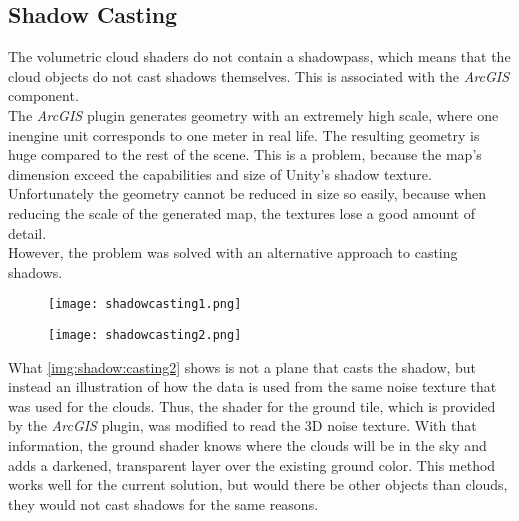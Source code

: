 \clearpage

\subsection{Shadow Casting}
\label{section:techimpl:shadow}
The \gls{volumetric} cloud \gls{shader}s do not contain a \gls{shadowpass}, which means that the cloud objects do not cast shadows themselves.
This is associated with the \emph{ArcGIS}  component.
\\
The \emph{ArcGIS} plugin generates geometry with an extremely high scale, where one \gls{inengine} unit corresponds to one meter in real life.
The resulting geometry is huge compared to the rest of the scene. This is a problem, because the map's dimension exceed the capabilities and size of Unity's shadow texture.
Unfortunately the geometry cannot be reduced in size so easily, because when reducing the scale of the generated map, the textures lose a good amount of detail.
\\
However, the problem was solved with an alternative approach to casting shadows.

\begin{figure}[H]
    \centering
        \begin{minipage}{0.47\linewidth}
            \texttt{[image: shadowcasting1.png]}
            \label{img:shadow:casting1}
        \end{minipage}
    \hfill
        \begin{minipage}{0.47\linewidth}
            \texttt{[image: shadowcasting2.png]}
            \label{img:shadow:casting2}
        \end{minipage}
\end{figure}

\noindent
What \autoref{img:shadow:casting2} shows is not a plane that casts the shadow, but instead an illustration of how the data is used from the same \gls{noise} texture that was used for the clouds.
Thus, the shader for the ground tile, which is provided by the \emph{ArcGIS} plugin, was modified to read the 3D \gls{noise} texture.
With that information, the ground shader knows where the clouds will be in the sky and adds a darkened, transparent layer over the existing ground color.
\emptyline
This method works well for the current solution, but would there be other objects than clouds, they would not cast shadows for the same reasons.

